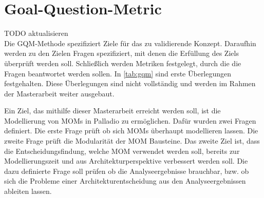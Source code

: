 \section{Goal-Question-Metric}
TODO aktualisieren \\
Die GQM-Methode \cite{gqm} spezifiziert Ziele für das zu validierende Konzept. Daraufhin werden zu den Zielen Fragen spezifiziert, mit denen die Erfüllung des Ziels überprüft werden soll. Schließlich werden Metriken festgelegt, durch die die Fragen beantwortet werden sollen. In \autoref{tab:gqm} sind erste Überlegungen festgehalten. Diese Überlegungen sind nicht vollständig und werden im Rahmen der Masterarbeit weiter ausgebaut.\par
Ein Ziel, das mithilfe dieser Masterarbeit erreicht werden soll, ist die Modellierung von MOMs in Palladio zu ermöglichen. Dafür wurden zwei Fragen definiert. Die erste Frage prüft ob sich MOMs überhaupt modellieren lassen. Die zweite Frage prüft die Modularität der MOM Bausteine. Das zweite Ziel ist, dass die Entscheidungsfindung, welche MOM verwendet werden soll, bereits zur Modellierungszeit und aus Architekturperspektive verbessert werden soll. Die dazu definierte Frage soll prüfen ob die Analyseergebnisse brauchbar, bzw. ob sich die Probleme einer Architekturentscheidung aus den Analyseergebnissen ableiten lassen. 
